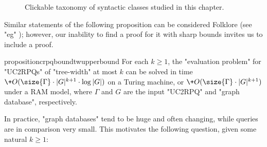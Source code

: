 \begin{figure}
	\centering
	\caption{
		\AP\label{fig:taonomy-syntactic}
		Clickable taxonomy of syntactic classes studied in this chapter.
	}
\end{figure}

Similar statements of the following proposition can be considered Folklore (see "eg" {\cite[Theorem IV.3]{RomeroBarceloVardi2017Homomorphism}}); however, our inability to find a proof for it with sharp bounds invites us to include a proof.
\begin{restatable}{proposition}{crpqboundtwupperbound}
	\AP\label{prop:crpq-bound-tree-width-upper-bound}
    For each $k \geq 1$, the "evaluation problem" for "UC2RPQs" of "tree-width" at
    most $k$ can be solved in time $\+O(\size{\Gamma} \cdot |G|^{k+1} \cdot \log{|G|})$ on a Turing machine,
	or $\+O(\size{\Gamma} \cdot |G|^{k+1})$ under a RAM model, where $\Gamma$ and $G$ are the input "UC2RPQ" and "graph database", respectively.
\end{restatable}



In practice, "graph databases" tend to be huge and often changing, while queries
are in comparison very small.
This motivates the following question, given some natural $k \geq 1$: 

